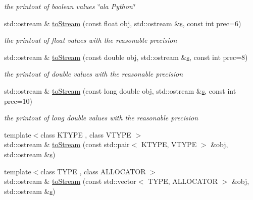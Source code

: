 \begin{DoxyCompactItemize}
\begin{DoxyCompactList}\small\item\em the printout of boolean values \char`\"{}a\textquotesingle{}la Python\char`\"{} \end{DoxyCompactList}\item 
std\+::ostream \& \hyperlink{namespace_d_d4hep_1_1_utils_af0a209fec5d19539ace63d69570c70b7}{to\+Stream} (const float obj, std\+::ostream \&\hyperlink{_volumes_8cpp_a17ca6bfc8040d695d3cada22a4763d40}{s}, const int prec=6)
\begin{DoxyCompactList}\small\item\em the printout of float values with the reasonable precision \end{DoxyCompactList}\item 
std\+::ostream \& \hyperlink{namespace_d_d4hep_1_1_utils_a63ebaf591a7f6deb9f4f5d9984e3b745}{to\+Stream} (const double obj, std\+::ostream \&\hyperlink{_volumes_8cpp_a17ca6bfc8040d695d3cada22a4763d40}{s}, const int prec=8)
\begin{DoxyCompactList}\small\item\em the printout of double values with the reasonable precision \end{DoxyCompactList}\item 
std\+::ostream \& \hyperlink{namespace_d_d4hep_1_1_utils_ac4881c1c93e7105a9f241b2664679409}{to\+Stream} (const long double obj, std\+::ostream \&\hyperlink{_volumes_8cpp_a17ca6bfc8040d695d3cada22a4763d40}{s}, const int prec=10)
\begin{DoxyCompactList}\small\item\em the printout of long double values with the reasonable precision \end{DoxyCompactList}\item 
{\footnotesize template$<$class K\+T\+Y\+PE , class V\+T\+Y\+PE $>$ }\\std\+::ostream \& \hyperlink{namespace_d_d4hep_1_1_utils_a503ee3c9f053315e32b3e5c86bc653d9}{to\+Stream} (const std\+::pair$<$ K\+T\+Y\+PE, V\+T\+Y\+PE $>$ \&obj, std\+::ostream \&\hyperlink{_volumes_8cpp_a17ca6bfc8040d695d3cada22a4763d40}{s})
\item 
{\footnotesize template$<$class T\+Y\+PE , class A\+L\+L\+O\+C\+A\+T\+OR $>$ }\\std\+::ostream \& \hyperlink{namespace_d_d4hep_1_1_utils_a9018241e575dafecf003bf871b8d6ef1}{to\+Stream} (const std\+::vector$<$ T\+Y\+PE, A\+L\+L\+O\+C\+A\+T\+OR $>$ \&obj, std\+::ostream \&\hyperlink{_volumes_8cpp_a17ca6bfc8040d695d3cada22a4763d40}{s})

\end{DoxyCompactItemize}
